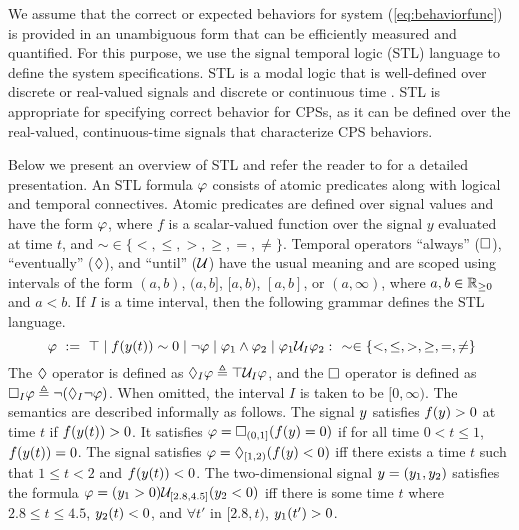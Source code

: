 We assume that the correct or expected behaviors for system (\ref{eq:behaviorfunc}) is provided in an unambiguous form that can be efficiently measured and quantified. For this purpose, we use the signal temporal logic (STL) language to define the system specifications.
STL is a modal logic that is well-defined over discrete or real-valued signals and discrete or continuous time \cite{MalerN04}.
STL is appropriate for specifying correct behavior for CPSs, as it can be defined over the real-valued, continuous-time signals that characterize CPS behaviors.
  
Below we present an overview of STL and refer the reader to \cite{MalerN04} for a detailed presentation.
An STL formula $\varphi$ consists of atomic predicates along with logical and temporal connectives.
Atomic predicates are defined over signal values and have the form $\varphi$, where $f$ is a scalar-valued function over the signal $y$ evaluated at time $t$, and $\sim \in \{ <,\leq, >, \geq, =, \neq \}$.
Temporal operators ``always'' ($\Box$), ``eventually'' ($\Diamond$), and ``until'' ($\mathcal{U}$) have the usual meaning and are scoped using intervals of the form $(a,b)$, $(a,b]$, $[a,b)$, $[a,b]$, or $(a,\infty)$, where 
$a,b\in \mathbb{R}_{\geq 0}$ and $a<b$. If $I$ is a time interval, then the following grammar defines the STL language.
\begin{equation}~\label{eqn:stl-gen}
\varphi ~ := ~ \top \; | \; f(y(t))\sim 0 \; | \; \neg \varphi \; | \;
\varphi_1 \wedge \varphi_2 \; | \; \varphi_1 \mathcal{U}_I \varphi_2:~~\sim \in \{ <,\leq,>,\geq,=,\neq \}
\end{equation}
The $\Diamond$ operator is defined as $\Diamond_I \varphi \triangleq \top \mathcal{U}_I \varphi$, and the $\Box$ operator is defined as $\Box_I \varphi \triangleq \neg (\Diamond _I \neg \varphi)$. When omitted, the interval $I$ is taken  to be $[0,\infty)$. The semantics are described informally as follows. The signal $y$ satisfies $f(y)> 0$ at time $t$ if $f(y(t))>0$. It satisfies $\varphi = \Box_{(0,1]}(f(y)=0)$ if for all time $0< t \leq 1$, $f(y(t))=0$. The signal satisfies $\varphi= \Diamond_{[1,2)}(f(y)<0)$ iff there exists a time $t$ such that $1\leq t < 2$ and $f(y(t))<0$. The two-dimensional signal $y=(y_1,y_2)$ satisfies the formula $\varphi=(y_1>0)\mathcal{U}_{[2.8,4.5]}(y_2<0)$ iff there is some time $t$ where $2.8 \leq t \leq 4.5$, $y_2(t)<0$, and $\forall t'$ in $[2.8,t)$, $y_1(t')>0$. 

